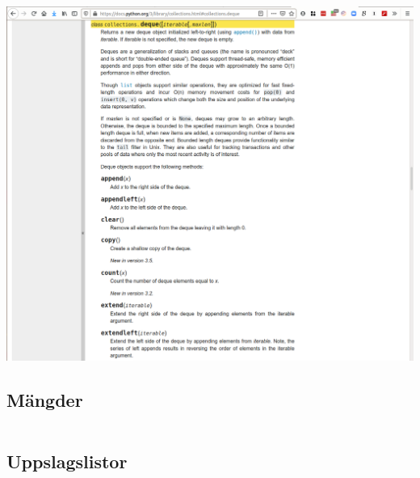 \begin{frame}[fragile]
  \begin{example}[queue.py]
    \inputminted{python}{examples/queue.py}
  \end{example}
\end{frame}

\begin{frame}
  \includegraphics[width=\columnwidth]{figs/docs-deque.png}
\end{frame}


\subsection{Mängder}

\begin{frame}[fragile]
  \begin{example}[sets.py]
    \inputminted{python}{examples/sets.py}
  \end{example}
\end{frame}


\subsection{Uppslagslistor}

